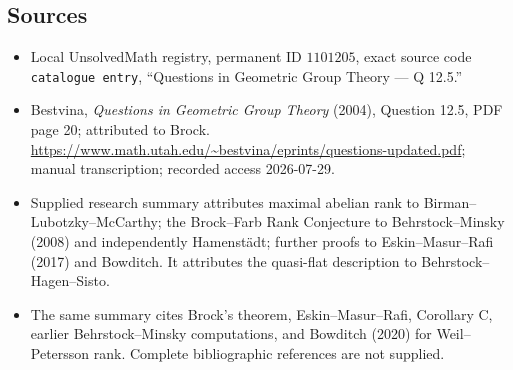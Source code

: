 \documentclass[11pt]{article}
\begin{document}
\subsection{Sources}
\begin{itemize}
\item Local UnsolvedMath registry, permanent ID \(1101205\), exact source code \texttt{catalogue entry}, ``Questions in Geometric Group Theory --- Q 12.5.''
\item Bestvina, \emph{Questions in Geometric Group Theory} (2004), Question 12.5, PDF page 20; attributed to Brock. \url{https://www.math.utah.edu/~bestvina/eprints/questions-updated.pdf}; manual transcription; recorded access 2026-07-29.
\item Supplied research summary attributes maximal abelian rank to Birman--Lubotzky--McCarthy; the Brock--Farb Rank Conjecture to Behrstock--Minsky (2008) and independently Hamenst\"adt; further proofs to Eskin--Masur--Rafi (2017) and Bowditch. It attributes the quasi-flat description to Behrstock--Hagen--Sisto.
\item The same summary cites Brock's theorem, Eskin--Masur--Rafi, Corollary C, earlier Behrstock--Minsky computations, and Bowditch (2020) for Weil--Petersson rank. Complete bibliographic references are not supplied.
\end{itemize}
\end{document}
